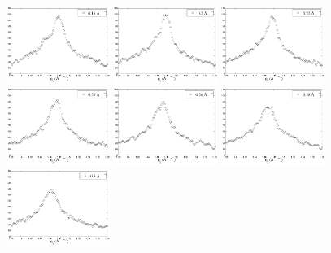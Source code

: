 \begin{figure}[htbp]
  \includegraphics[width=0.3\textwidth]{figures/ripple/NGIWAXS/qrplot7}
  \includegraphics[width=0.3\textwidth]{figures/ripple/NGIWAXS/qrplot8}
  \includegraphics[width=0.3\textwidth]{figures/ripple/NGIWAXS/qrplot9}
  \includegraphics[width=0.3\textwidth]{figures/ripple/NGIWAXS/qrplot10}
  \includegraphics[width=0.3\textwidth]{figures/ripple/NGIWAXS/qrplot11}
  \includegraphics[width=0.3\textwidth]{figures/ripple/NGIWAXS/qrplot12}
  \includegraphics[width=0.3\textwidth]{figures/ripple/NGIWAXS/qrplot13}

\end{figure}
